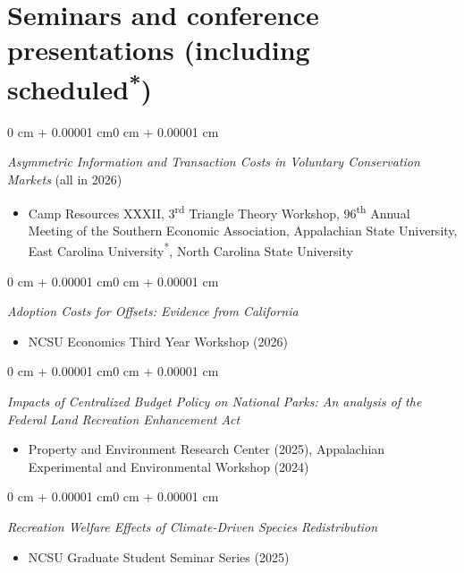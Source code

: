 \documentclass[12pt]{article}
\newenvironment{highlights}{
	\begin{itemize}[
		topsep=0.10 cm,
		partopsep=0pt,
		leftmargin=0.3 cm + 10pt,
		label={}
		]
	\setlength{\parsep}{0.10cm}\setlength{\itemsep}{0pt}
	}{
	\end{itemize}
}
\newenvironment{onecolentry}{
	\begin{adjustwidth}{0 cm + 0.00001 cm}{0 cm + 0.00001 cm}
	}
	{
	\end{adjustwidth}
}
\newcommand{\Star}[1]{#1\textsuperscript{*}}
\begin{document}
\section{Seminars and conference presentations (including \texorpdfstring{\Star{scheduled}}{scheduled*})}

\begin{onecolentry}
	\emph{Asymmetric Information and Transaction Costs in Voluntary Conservation Markets} (all in 2026)
	\begin{highlights}
		\item \small Camp Resources XXXII, 3\textsuperscript{rd} Triangle Theory Workshop, 96\textsuperscript{th} Annual Meeting of the Southern Economic Association, Appalachian State University, \texorpdfstring{\Star{East Carolina University}}{East Carolina University}, North Carolina State University
	\end{highlights}
\end{onecolentry}

\vspace{0.1cm}

\begin{onecolentry}
	\emph{Adoption Costs for Offsets: Evidence from California}
	\begin{highlights}
		\item \small NCSU Economics Third Year Workshop (2026)
	\end{highlights}
\end{onecolentry}

\vspace{0.1cm}

\begin{onecolentry}
	\emph{Impacts of Centralized Budget Policy on National Parks: An analysis of the Federal Land Recreation Enhancement Act}
	\begin{highlights}
		\item \small Property and Environment Research Center (2025), Appalachian Experimental and Environmental Workshop (2024)
	\end{highlights}
\end{onecolentry}

\vspace{0.1cm}

\begin{onecolentry}
	\emph{Recreation Welfare Effects of Climate-Driven Species Redistribution}
	\begin{highlights}
		\item \small NCSU Graduate Student Seminar Series (2025)
	\end{highlights}
\end{onecolentry}
\end{document}
